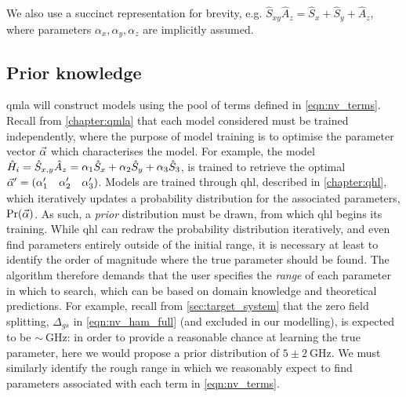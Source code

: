 We also use a succinct representation for brevity, e.g. $\hat{S}_{xy}\hat{A}_z =  \hat{S}_x + \hat{S}_y + \hat{A}_z$, 
    where parameters $\alpha_x, \alpha_y, \alpha_z$ are implicitly assumed. 

\subsection{Prior knowledge}

\gls{qmla} will construct models using the pool of terms defined in \cref{eqn:nv_terms}. 
Recall from \cref{chapter:qmla} that each model considered must be trained independently, 
    where the purpose of model training is to optimise the parameter vector $\vec{\alpha}$ which characterises the model. 
For example, the model 
    $\hat{H}_i = \hat{S}_{x,y} \hat{A}_{z} = \alpha_1 \hat{S}_x  + \alpha_2 \hat{S}_y + \alpha_3 \hat{S}_3$,
    is trained to retrieve the optimal $\vec{\alpha}^{\prime} = \begin{matrix}(\alpha_1^{\prime} & \alpha_2^{\prime} & \alpha_3^{\prime})\end{matrix}$. 
Models are trained through \gls{qhl}, described in \cref{chapter:qhl}, 
    which iteratively updates a probability distribution for the associated parameters, $\Pr(\vec{\alpha})$. 
As such, a \emph{prior} distribution must be drawn, from which \gls{qhl} begins its training. 
While \gls{qhl} can redraw the probability distribution iteratively, and even find parameters entirely outside of the initial range, 
    it is necessary at least to identify the order of magnitude where the true parameter should be found. 
The algorithm therefore demands that the user specifies the \emph{range} of each parameter in which to search, 
    which can be based on domain knowledge and theoretical predictions. 
For example, recall from \cref{sec:target_system} that the zero field splitting, $\Delta_{gs}$ in \cref{eqn:nv_ham_full} (and excluded in our modelling),
    is expected to be $\sim \SI{}{\giga\hertz}$: in order to provide a reasonable chance at learning the true parameter,
    here we would propose a prior distribution of $5 \pm 2 \SI{}{\giga\hertz}$.
We must similarly identify the rough range in which we reasonably expect to find parameters associated with each term in \cref{eqn:nv_terms}.
\par

